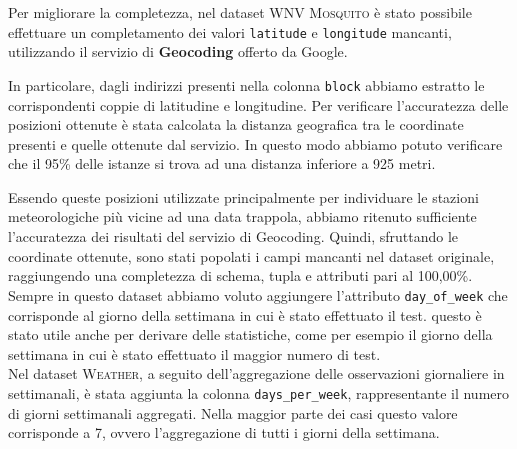 Per migliorare la completezza, nel dataset \textsc{WNV Mosquito} è stato 
possibile effettuare un completamento dei valori \texttt{latitude} e 
\texttt{longitude} mancanti, utilizzando il servizio di \textbf{Geocoding} 
offerto da Google.

In particolare, dagli indirizzi presenti nella colonna \texttt{block} abbiamo 
estratto le corrispondenti coppie di latitudine e longitudine. 
Per verificare l'accuratezza delle posizioni ottenute è stata calcolata la 
distanza geografica tra le coordinate presenti e quelle ottenute dal servizio. 
In questo modo abbiamo potuto verificare che il 95\% delle istanze si trova ad 
una distanza inferiore a 925 metri.

Essendo queste posizioni utilizzate principalmente per individuare le stazioni 
meteorologiche più vicine ad una data trappola, abbiamo ritenuto sufficiente 
l'accuratezza dei risultati del servizio di Geocoding. Quindi, sfruttando 
le coordinate ottenute, sono stati popolati i campi mancanti nel dataset 
originale, raggiungendo una completezza di schema, tupla e attributi pari al 
100,00\%.
\\
Sempre in questo dataset abbiamo voluto aggiungere l'attributo 
\texttt{day\_of\_week} che corrisponde al giorno della settimana in cui è stato 
effettuato il test. questo è stato utile anche per derivare delle statistiche, 
come per esempio il giorno della settimana in cui è stato effettuato il maggior 
numero di test. 
\\

Nel dataset \textsc{Weather}, a seguito dell'aggregazione delle osservazioni 
giornaliere in settimanali, è stata aggiunta la colonna 
\texttt{days\_per\_week}, rappresentante il numero di giorni settimanali 
aggregati. Nella maggior parte dei casi questo valore corrisponde a 7, ovvero 
l'aggregazione di tutti i giorni della settimana.

